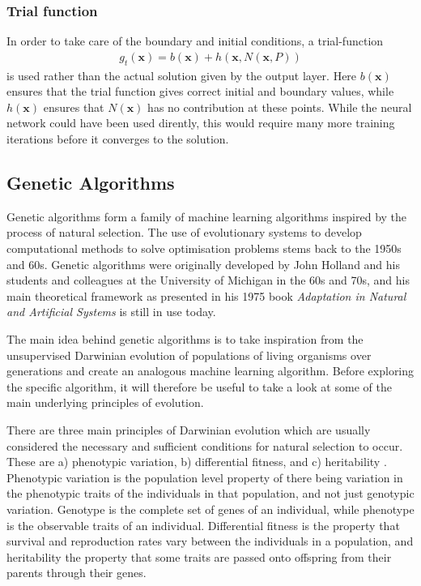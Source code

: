 \documentclass[multicolumn, 9pt]{extarticle}
\begin{document}
\subsubsection{Trial function}\label{sec:trialf}
In order to take care of the boundary and initial conditions, a trial-function
\begin{align*}
	g_t(\mathbf{x}) = b(\mathbf{x}) + h(\mathbf{x}, N(\mathbf{x}, P))
\end{align*}
is used rather than the actual solution given by the output layer. Here $b(\mathbf{x})$ ensures that the trial function gives correct initial and boundary values, while $h(\mathbf{x})$ ensures that $N(\mathbf{x})$ has no contribution at these points. While the neural network could have been used dirently, this would require many more training iterations before it converges to the solution.




\subsection{Genetic Algorithms}
Genetic algorithms form a family of machine learning algorithms inspired by the process of natural selection. The use of evolutionary systems to develop computational methods to solve optimisation problems stems \newline back to the 1950s and 60s. Genetic algorithms were originally developed by John Holland and his students and colleagues at the University of Michigan in the 60s and 70s, and his main theoretical framework as presented in his 1975 book \textit{Adaptation in Natural and Artificial Systems} \cite{Holland} is still in use today.

The main idea behind genetic algorithms is to take inspiration from the unsupervised Darwinian evolution of populations of living organisms over generations and create an analogous machine learning algorithm. Before exploring the specific algorithm, it will therefore be useful to take a look at some of the main underlying principles of evolution.

There are three main principles of Darwinian evolution which are usually considered the necessary and sufficient conditions for natural selection to occur. These are a) phenotypic variation, b) differential fitness, and c) heritability \cite{Eyal}. Phenotypic variation is the population level property of there being variation in the phenotypic traits of the individuals in that population, and not just genotypic variation. Genotype is the complete set of genes of an individual, while phenotype is the observable traits of an individual. Differential fitness is the property that survival and reproduction rates vary between the individuals in a population, and heritability the property that some traits are passed onto offspring from their parents through their genes.
\end{document}
